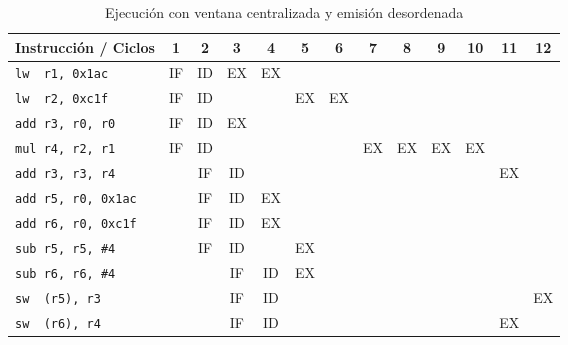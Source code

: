 \begin{ejercicio}
\begin{table}[H]
\centering
\scriptsize
\begin{tabular}{|l|c|c|c|c|c|c|c|c|c|c|c|c|}
    \hline
    Instrucción / Ciclos & 1 & 2 & 3 & 4 & 5 & 6 & 7 & 8 & 9 & 10 & 11 & 12  \\
    \hline
    \verb|lw  r1, 0x1ac|     & IF & ID & EX & EX & & & & & & & & \\
    \hline        
    \verb|lw  r2, 0xc1f|     & IF & ID & & & EX & EX & & & & & & \\
    \hline           
    \verb|add r3, r0, r0|    & IF & ID & EX & & & & & & & & & \\
    \hline                        
    \verb|mul r4, r2, r1|    & IF & ID & & & & & EX & EX & EX & EX & & \\
    \hline            
    \verb|add r3, r3, r4|    & & IF & ID & & & & & & & & EX & \\
    \hline
    \verb|add r5, r0, 0x1ac| & & IF & ID & EX & & & & & & & & \\
    \hline
    \verb|add r6, r0, 0xc1f| & & IF & ID & EX & & & & & & & & \\
    \hline
    \verb|sub r5, r5, #4|    & & IF & ID & & EX & & & & & & & \\
    \hline            
    \verb|sub r6, r6, #4|    & & & IF & ID & EX & & & & & & & \\
    \hline
    \verb|sw  (r5), r3|      & & & IF & ID & & & & & & &  & EX \\
    \hline
    \verb|sw  (r6), r4|      & & & IF & ID & & & & & & & EX &  \\
    \hline
\end{tabular}
\caption{Ejecución con ventana centralizada y emisión desordenada}
\end{table}


\end{ejercicio}
